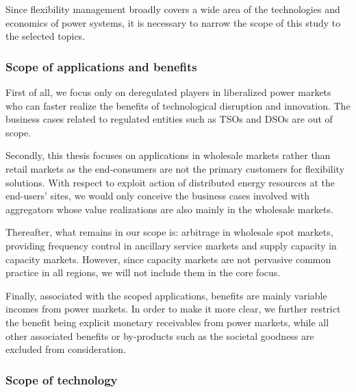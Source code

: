 




Since flexibility management broadly covers a wide area of the technologies and economics of power systems, it is necessary to narrow the scope of this study to the selected topics.

\subsubsection{Scope of applications and benefits}

First of all, we focus only on deregulated players in liberalized power markets who can faster realize the benefits of technological disruption and innovation. The business cases related to regulated entities such as TSOs and DSOs are out of scope.

Secondly, this thesis focuses on applications in wholesale markets rather than retail markets as the end-consumers are not the primary customers for flexibility solutions. With respect to exploit action of distributed energy resources at the end-users' sites, we would only conceive the business cases involved with aggregators whose value realizations are also mainly in the wholesale markets.

Thereafter, what remains in our scope is: arbitrage in wholesale spot markets, providing frequency control in ancillary service markets and supply capacity in capacity markets. However, since capacity markets are not pervasive common practice in all regions, we will not include them in the core focus.

Finally, associated with the scoped applications, benefits are mainly variable incomes from power markets. In order to make it more clear, we further restrict the benefit being explicit monetary receivables from power markets, while all other associated benefits or by-products such as the societal goodness are excluded from consideration. 

\subsubsection{Scope of technology}

